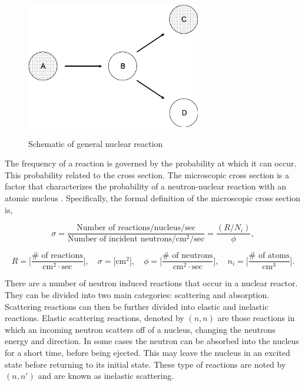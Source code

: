 \begin{figure}[b]
  \centering
  \includegraphics[width=3.0in]{images/nuclearReaction.png}\\
  \caption{Schematic of general nuclear reaction}
  \label{fig:nuclearReaction}
\end{figure} 

The frequency of a reaction is governed by the probability at which it can occur. This probability related to the  cross section. The microscopic cross section is a factor that characterizes the probability of a neutron-nuclear reaction with an atomic nucleus \cite{duderstadt1976}. Specifically, the formal definition of the microscopic cross section is,

\begin{equation}
    \sigma = \frac{\text{Number of reactions} / \text{nucleus} / \text{sec}}{\text{Number of incident neutrons} / \text{cm}^{2} / \text{sec}} = \frac{(R/N_{i})}{\phi},
\end{equation}

\begin{equation*}
    R = \bigg[\frac{\# \text{ of reactions}}{\text{cm}^{2}\cdot \text{sec}}\bigg], \quad \sigma = \big[\text{cm}^{2}\big], \quad \phi = \bigg[\frac{\# \text{ of neutrons}}{\text{cm}^{2}\cdot \text{sec}} \bigg], \quad n_{i} = \bigg[\frac{\# \text{ of atoms}}{\text{cm}^{3}}\bigg].
\end{equation*}

There are a number of neutron induced reactions that occur in a nuclear reactor. They can be divided into two main categories: scattering and absorption. Scattering reactions can then be further divided into elastic and inelastic reactions. Elastic scattering reactions, denoted by $(n,n)$ are those reactions in which an incoming neutron scatters off of a nucleus, changing the neutrons energy and direction. In some cases the neutron can be absorbed into the nucleus for a short time, before being ejected. This may leave the nucleus in an excited state before returning to its initial state. These type of reactions are noted by $(n,n')$ and are known as inelastic scattering. 

